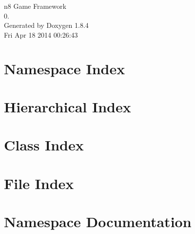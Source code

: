 \documentclass[twoside]{book}
\newcommand{\clearemptydoublepage}{%
  \newpage{\pagestyle{empty}\cleardoublepage}%
}
\begin{document}
\hypersetup{pageanchor=false}
\begin{titlepage}
\vspace*{7cm}
\begin{center}%
{\Large n8 Game Framework \\[1ex]\large 0. }\\
\vspace*{1cm}
{\large Generated by Doxygen 1.8.4}\\
\vspace*{0.5cm}
{\small Fri Apr 18 2014 00:26:43}\\
\end{center}
\end{titlepage}
\clearemptydoublepage
\tableofcontents
\clearemptydoublepage
{}
\hypersetup{pageanchor=true}

\chapter{Namespace Index}

\chapter{Hierarchical Index}

\chapter{Class Index}

\chapter{File Index}

\chapter{Namespace Documentation}






\end{document}
